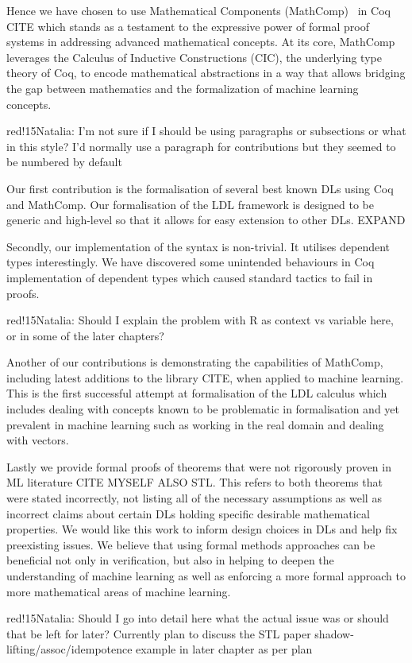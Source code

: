 \documentclass[a4paper,UKenglish,cleveref, autoref, thm-restate]{lipics-v2021}
\newcommand{\natalia}[1]{\begin{authorComment}{red!15}Natalia: #1\end{authorComment}}
\begin{document}
Hence we have chosen to use Mathematical Components (MathComp)~\cite{mathcomp} in Coq CITE which stands as a testament to the expressive power of formal proof systems in addressing advanced mathematical concepts. At its core, MathComp leverages the Calculus of Inductive Constructions (CIC), the underlying type theory of Coq, to encode mathematical abstractions in a way that allows bridging the gap between mathematics and the formalization of machine learning concepts. 

\natalia{I'm not sure if I should be using paragraphs or subsections or what in this style? I'd normally use a paragraph for contributions but they seemed to be numbered by default}

Our first contribution is the formalisation of several best known DLs using Coq and MathComp. Our formalisation of the LDL framework is designed to be generic and high-level so that it allows for easy extension to other DLs. EXPAND

Secondly, our implementation of the syntax is non-trivial. It utilises dependent types interestingly. We have discovered some unintended behaviours in Coq implementation of dependent types which caused standard tactics to fail in proofs. \natalia{Should I explain the problem with R as context vs variable here, or in some of the later chapters?}

Another of our contributions is demonstrating the capabilities of MathComp, including latest additions to the library CITE, when applied to machine learning. This is the first successful attempt at formalisation of the LDL calculus which includes dealing with concepts known to be problematic in formalisation and yet prevalent in machine learning such as working in the real domain and dealing with vectors.

Lastly we provide formal proofs of theorems that were not rigorously proven in ML literature CITE MYSELF ALSO STL. This refers to both theorems that were stated incorrectly, not listing all of the necessary assumptions as well as incorrect claims about certain DLs holding specific desirable mathematical properties. 
We would like this work to inform design choices in DLs and help fix preexisting issues. We believe that using formal methods approaches can be beneficial not only in verification, but also in helping to deepen the understanding of machine learning as well as enforcing a more formal approach to more mathematical areas of machine learning. \natalia{Should I go into detail here what the actual issue was or should that be left for later? Currently plan to discuss the STL paper shadow-lifting/assoc/idempotence example in later chapter as per plan}
\end{document}
